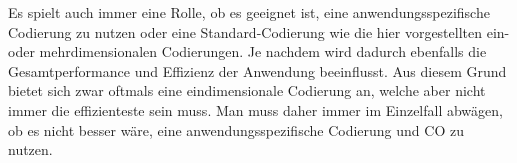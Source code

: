 \documentclass{llncs}
\begin{document}
	Es spielt auch immer eine Rolle, ob es geeignet ist, eine anwendungsspezifische Codierung zu nutzen oder eine Standard-Codierung wie die hier vorgestellten ein- oder mehrdimensionalen Codierungen. Je nachdem wird dadurch ebenfalls die Gesamtperformance und Effizienz der Anwendung beeinflusst. Aus diesem Grund bietet sich zwar oftmals eine eindimensionale Codierung an, welche aber nicht immer die effizienteste sein muss. Man muss daher immer im Einzelfall abwägen, ob es nicht besser wäre, eine anwendungsspezifische Codierung und CO zu nutzen.
	
\pagebreak
	
 

\end{document}
